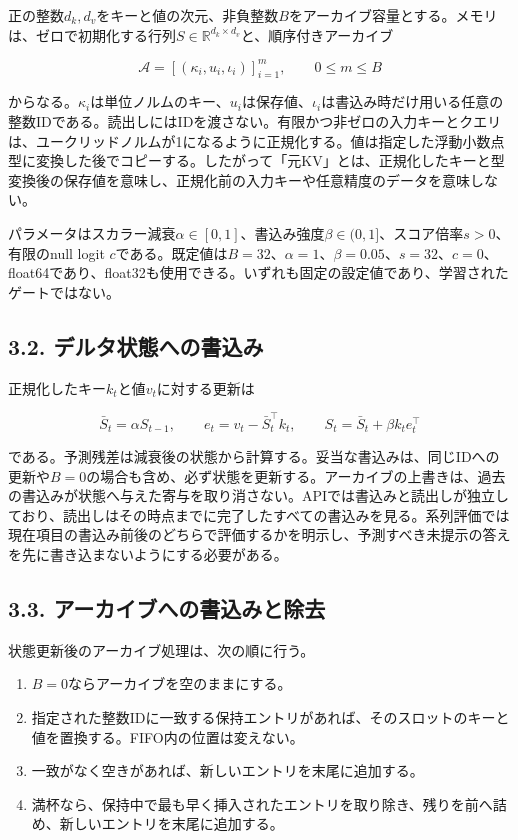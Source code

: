 \documentclass[11pt,a4paper]{article}
\providecommand{\tightlist}{\setlength{\itemsep}{0pt}\setlength{\parskip}{0pt}}
\begin{document}
正の整数\(d_k,d_v\)をキーと値の次元、非負整数\(B\)をアーカイブ容量とする。メモリは、ゼロで初期化する行列\(S\in\mathbb{R}^{d_k\times d_v}\)と、順序付きアーカイブ

\nopagebreak[4]

\[
\mathcal A=[(\kappa_i,u_i,\iota_i)]_{i=1}^{m},\qquad 0\leq m\leq B
\]

からなる。\(\kappa_i\)は単位ノルムのキー、\(u_i\)は保存値、\(\iota_i\)は書込み時だけ用いる任意の整数IDである。読出しにはIDを渡さない。有限かつ非ゼロの入力キーとクエリは、ユークリッドノルムが1になるように正規化する。値は指定した浮動小数点型に変換した後でコピーする。したがって「元KV」とは、正規化したキーと型変換後の保存値を意味し、正規化前の入力キーや任意精度のデータを意味しない。

パラメータはスカラー減衰\(\alpha\in[0,1]\)、書込み強度\(\beta\in(0,1]\)、スコア倍率\(s>0\)、有限のnull logit \(c\)である。既定値は\(B=32\)、\(\alpha=1\)、\(\beta=0.05\)、\(s=32\)、\(c=0\)、float64であり、float32も使用できる。いずれも固定の設定値であり、学習されたゲートではない。

\subsection{3.2. デルタ状態への書込み}\label{ux30c7ux30ebux30bfux72b6ux614bux3078ux306eux66f8ux8fbcux307f}

正規化したキー\(k_t\)と値\(v_t\)に対する更新は

\nopagebreak[4]

\[
\bar S_t=\alpha S_{t-1},\qquad
e_t=v_t-\bar S_t^{\top}k_t,\qquad
S_t=\bar S_t+\beta k_te_t^{\top}
\tag{1}
\]

である。予測残差は減衰後の状態から計算する。妥当な書込みは、同じIDへの更新や\(B=0\)の場合も含め、必ず状態を更新する。アーカイブの上書きは、過去の書込みが状態へ与えた寄与を取り消さない。APIでは書込みと読出しが独立しており、読出しはその時点までに完了したすべての書込みを見る。系列評価では現在項目の書込み前後のどちらで評価するかを明示し、予測すべき未提示の答えを先に書き込まないようにする必要がある。

\subsection{3.3. アーカイブへの書込みと除去}\label{ux30a2ux30fcux30abux30a4ux30d6ux3078ux306eux66f8ux8fbcux307fux3068ux9664ux53bb}

状態更新後のアーカイブ処理は、次の順に行う。

\begin{enumerate}
\def\labelenumi{\arabic{enumi}.}
\tightlist
\item
  \(B=0\)ならアーカイブを空のままにする。
\item
  指定された整数IDに一致する保持エントリがあれば、そのスロットのキーと値を置換する。FIFO内の位置は変えない。
\item
  一致がなく空きがあれば、新しいエントリを末尾に追加する。
\item
  満杯なら、保持中で最も早く挿入されたエントリを取り除き、残りを前へ詰め、新しいエントリを末尾に追加する。
\end{enumerate}
\end{document}
